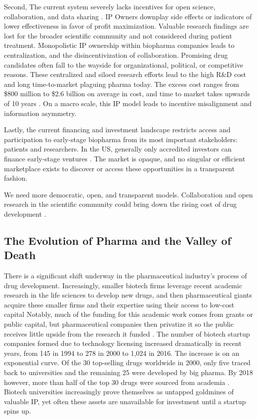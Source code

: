 \documentclass[12pt,letterpaper]{article}
\begin{document}
Second, The current system severely lacks incentives for open science, collaboration, and data sharing \citep{Ali-Khan2017}. IP Owners downplay side effects or indicators of lower effectiveness in favor of profit maximization. Valuable research findings are lost for the broader scientific community and not considered during patient treatment. Monopolistic IP ownership within biopharma companies leads to centralization, and the disincentivization of collaboration. Promising drug candidates often fall to the wayside for organizational, political, or competitive reasons. These centralized and siloed research efforts lead to the high R\&D cost and long time-to-market plaguing pharma today. The excess cost ranges from \$800 million to \$2.6 billion on average in cost, and time to market takes upwards of 10 years  \citep{DiMasi2016}. On a macro scale, this IP model leads to incentive misalignment and information asymmetry. 

Lastly, the current financing and investment landscape restricts access and participation to early-stage biopharma from its most important stakeholders: patients and researchers. In the US, generally only accredited investors can finance early-stage ventures \citep{Rowley2018}. The market is opaque, and no singular or efficient marketplace exists to discover or access these opportunities in a transparent fashion.

We need more democratic, open, and transparent models. Collaboration and open research in the scientific community could bring down the rising cost of drug development \citep{Bookbinder2020}. 

\subsection{The Evolution of Pharma and the Valley of Death}
There is a significant shift underway in the pharmaceutical industry’s process of drug development. Increasingly, smaller biotech firms leverage recent academic research in the life sciences to develop new drugs, and then pharmaceutical giants acquire these smaller firms and their expertise using their access to low-cost capital \citep{Huang2021} Notably, much of the funding for this academic work comes from grants or public capital, but pharmaceutical companies then privatize it so the public receives little upside from the research it funded \citep{Toole2004}. The number of biotech startup companies formed due to technology licensing increased dramatically in recent years, from 145 in 1994 to 278 in 2000 to 1,024 in 2016. The increase is on an exponential curve. Of the 30 top-selling drugs worldwide in 2000, only five traced back to universities and the remaining 25 were developed by big pharma. By 2018 however, more than half of the top 30 drugs were sourced from academia \citep{Huang2021}. Biotech universities increasingly prove themselves as untapped goldmines of valuable IP, yet often these assets are unavailable for investment until a startup spins up. 
\end{document}
